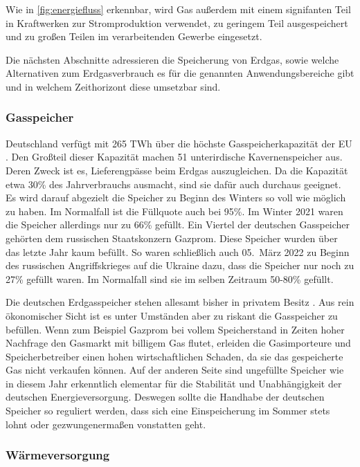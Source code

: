 Wie in \autoref{fig:energiefluss} erkennbar, wird Gas außerdem mit einem signifanten Teil in Kraftwerken zur Stromproduktion verwendet, zu geringem Teil ausgespeichert und zu großen Teilen im verarbeitenden Gewerbe eingesetzt. 

Die nächsten Abschnitte adressieren die Speicherung von Erdgas, sowie welche Alternativen zum Erdgasverbrauch es für die genannten Anwendungsbereiche gibt und in welchem Zeithorizont diese umsetzbar sind.

\subsubsection{Gasspeicher}

Deutschland verfügt mit 265 TWh über die höchste Gasspeicherkapazität der EU \cite{iwd}. Den Großteil dieser Kapazität machen 51 unterirdische Kavernenspeicher aus. Deren Zweck ist es, Lieferengpässe beim Erdgas auszugleichen. Da die Kapazität etwa 30\% des Jahrverbrauchs ausmacht, sind sie dafür auch durchaus geeignet.
Es wird darauf abgezielt die Speicher zu Beginn des Winters so voll wie möglich zu haben. Im Normalfall ist die Füllquote auch bei 95\%. Im Winter 2021 waren die Speicher allerdings nur zu 66\% gefüllt. Ein Viertel der deutschen Gasspeicher gehörten dem russischen Staatskonzern Gazprom. Diese Speicher wurden über das letzte Jahr kaum befüllt. So waren schließlich auch 05.~März 2022 zu Beginn des russischen Angriffskrieges auf die Ukraine dazu, dass die Speicher nur noch zu 27\% gefüllt waren. Im Normalfall sind sie im selben Zeitraum 50-80\% gefüllt.

Die deutschen Erdgasspeicher stehen allesamt bisher in privatem Besitz \cite{leo}. Aus rein ökonomischer Sicht ist es unter Umständen aber zu riskant die Gasspeicher zu befüllen. Wenn zum Beispiel Gazprom bei vollem Speicherstand in Zeiten hoher Nachfrage den Gasmarkt mit billigem Gas flutet, erleiden die Gasimporteure und Speicherbetreiber einen hohen wirtschaftlichen Schaden, da sie das gespeicherte Gas nicht verkaufen können. Auf der anderen Seite sind ungefüllte Speicher wie in diesem Jahr erkenntlich elementar für die Stabilität und Unabhängigkeit der deutschen Energieversorgung. Deswegen sollte die Handhabe der deutschen Speicher so reguliert werden, dass sich eine Einspeicherung im Sommer stets lohnt oder gezwungenermaßen vonstatten geht.

\subsubsection{Wärmeversorgung}

